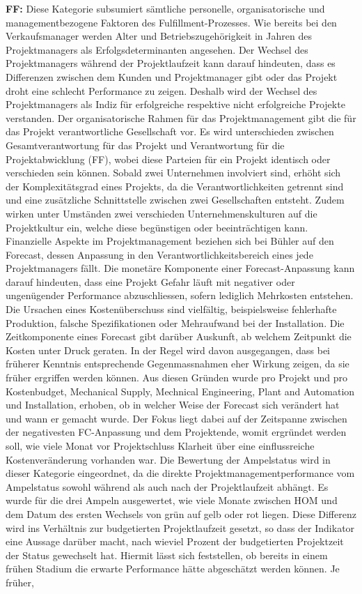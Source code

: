 \documentclass[11pt]{article}
\begin{document}
\newline\newline\textbf{FF:} Diese Kategorie subsumiert sämtliche personelle, organisatorische und managementbezogene Faktoren des Fulfillment-Prozesses. Wie bereits bei den Verkaufsmanager werden Alter und Betriebszugehörigkeit in Jahren des Projektmanagers als Erfolgsdeterminanten angesehen. Der Wechsel des Projektmanagers während der Projektlaufzeit kann darauf hindeuten, dass es Differenzen zwischen dem Kunden und Projektmanager gibt oder das Projekt droht eine schlecht Performance zu zeigen. Deshalb wird der Wechsel des Projektmanagers als Indiz für erfolgreiche respektive nicht erfolgreiche Projekte verstanden. Der organisatorische Rahmen für das Projektmanagement gibt die für das Projekt verantwortliche Gesellschaft vor. Es wird unterschieden zwischen Gesamtverantwortung für das Projekt und Verantwortung für die Projektabwicklung (FF), wobei diese Parteien für ein Projekt identisch oder verschieden sein können. Sobald zwei Unternehmen involviert sind, erhöht sich der Komplexitätsgrad eines Projekts, da die Verantwortlichkeiten getrennt sind und eine zusätzliche Schnittstelle zwischen zwei Gesellschaften entsteht. Zudem wirken unter Umständen zwei verschieden Unternehmenskulturen auf die Projektkultur ein, welche diese begünstigen oder beeinträchtigen kann. Finanzielle Aspekte im Projektmanagement beziehen sich bei Bühler auf den Forecast, dessen Anpassung in den Verantwortlichkeitsbereich eines jede Projektmanagers fällt. Die monetäre Komponente einer Forecast-Anpassung kann darauf hindeuten, dass eine Projekt Gefahr läuft mit negativer oder ungenügender Performance abzuschliessen, sofern lediglich Mehrkosten entstehen. Die Ursachen eines Kostenüberschuss sind vielfältig, beispielsweise fehlerhafte Produktion, falsche Spezifikationen oder Mehraufwand bei der Installation. Die Zeitkomponente eines Forecast gibt darüber Auskunft, ab welchem Zeitpunkt die Kosten unter Druck geraten. In der Regel wird davon ausgegangen, dass bei früherer Kenntnis entsprechende Gegenmassnahmen eher Wirkung zeigen, da sie früher ergriffen werden können. Aus diesen Gründen wurde pro Projekt und pro Kostenbudget, Mechanical Supply, Mechnical Engineering, Plant and Automation und Installation, erhoben, ob in welcher Weise der Forecast sich verändert hat und wann er gemacht wurde. Der Fokus liegt dabei auf der Zeitspanne zwischen der negativesten FC-Anpassung und dem Projektende, womit ergründet werden soll, wie viele Monat vor Projektschluss Klarheit über eine einflussreiche Kostenveränderung vorhanden war. Die Bewertung der Ampelstatus wird in dieser Kategorie eingeordnet, da die direkte Projektmanagementperformance vom Ampelstatus sowohl während als auch nach der Projektlaufzeit abhängt. Es wurde für die drei Ampeln ausgewertet, wie viele Monate zwischen HOM und dem Datum des ersten Wechsels von grün auf gelb oder rot liegen. Diese Differenz wird ins Verhältnis zur budgetierten Projektlaufzeit gesetzt, so dass der Indikator eine Aussage darüber macht, nach wieviel Prozent der budgetierten Projektzeit der Status gewechselt hat. Hiermit lässt sich feststellen, ob bereits in einem frühen Stadium die erwarte Performance hätte abgeschätzt werden können. Je früher, 
\end{document}
